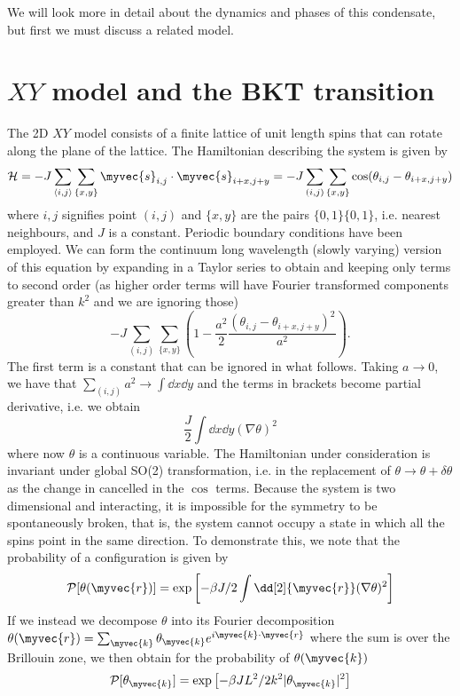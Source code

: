 We will look more in detail about the dynamics and phases of this condensate, but first we must discuss a related model.

\section{$XY$ model and the BKT transition}

The 2D $XY$ model consists of a finite lattice of unit length spins that can rotate along the plane of the lattice. The Hamiltonian describing the system is given by 
\[
\mathcal{H} = -J\sum_{\left <i,j \right>} \sum_{\{x,y\}} \myvec{s}_{i,j} \cdot \myvec{s}_{i+x,j+y} =
    -J\sum_{(i,j)} \sum_{\{x,y\}}  \cos( \theta_{i,j} - \theta_{i+x,j+y}) 
\]
 where $i, j$ signifies point $(i,j)$ and $\{x,y\}$ are the pairs $\{0,1\} \{0,1\}$, i.e. nearest neighbours, and $J$ is a constant. Periodic boundary conditions have been employed. We can form the continuum long wavelength (slowly varying) version of this equation by expanding in a Taylor series to obtain and keeping only terms to second order (as higher order terms will have Fourier transformed components greater than $k^2$ and we are ignoring those)
 \[
 -J\sum_{(i,j)} \sum_{\{x,y\}} \left ( 1 - \frac{a^2}{2} \frac{( \theta_{i,j} - \theta_{i+x,j+y})^2}{a^2} \right).
 \]
 The first term is a constant that can be ignored in what follows. Taking $a \to 0$, we have that $\sum_{(i,j)} a^2 \to \int \dd{x}\dd{y}$ and the terms in brackets become partial derivative, i.e. we obtain
 \[
 \frac{J}{2} \int \dd{x} \dd{y} (\nabla \theta)^2
 \]
 where now $\theta$ is a continuous variable. The Hamiltonian under consideration is invariant under global SO(2) transformation, i.e. in the replacement of $\theta \to \theta + \delta \theta$ as the change in cancelled in the $\cos$ terms. Because the system is two dimensional and interacting, it is impossible for the symmetry to be spontaneously broken, that is, the system cannot occupy a state in which all the spins point in the same direction. To demonstrate this, we note that the probability of a configuration is given by 
 \[
  \mathcal{P}[\theta(\myvec{r})] =   \exp \left [   -\beta J/2 \int \dd[2]{\myvec{r}} (\nabla \theta)^2 \right ]
 \] 
 If we instead we decompose  $\theta$ into its Fourier decomposition $\theta(\myvec{r}) = \sum_{\myvec{k}} \theta_{\myvec{k}} e^{i \myvec{k}\cdot \myvec{r}}$ where the sum is over the Brillouin zone, we then obtain for the probability of $\theta(\myvec{k})$
 \[
 \mathcal{P}[\theta_{\myvec{k}}] = \exp \left[-\beta J L^2/2 k^2 |\theta_{\myvec{k}}|^2 \right]
 \]
